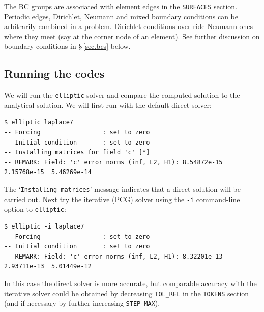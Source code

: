 \documentclass[11pt]{report}
\begin{document}
The BC groups are associated with element edges in the
\texttt{SURFACES} section.  Periodic edges, Dirichlet, Neumann and
mixed boundary conditions can be arbitrarily combined in a problem.
Dirichlet conditions over-ride Neumann ones where they meet (say at
the corner node of an element). See further discussion on boundary
conditions in \S\,\ref{sec.bcs} below.

\subsection{Running the codes}
\label{sec.runell}

We will run the \verb|elliptic| solver and compare the computed
solution to the analytical solution.  We will first run with the
default direct solver: 
%
{\small
\begin{verbatim}
$ elliptic laplace7
-- Forcing                 : set to zero
-- Initial condition       : set to zero
-- Installing matrices for field 'c' [*]
-- REMARK: Field: 'c' error norms (inf, L2, H1): 8.54872e-15  2.15768e-15  5.46269e-14
\end{verbatim}
}

The `\verb|Installing matrices|' message indicates that a direct
solution will be carried out.  Next try the iterative (PCG) solver
using the \verb+-i+ command-line option to \texttt{elliptic}:
%
{\small
\begin{verbatim}
$ elliptic -i laplace7
-- Forcing                 : set to zero
-- Initial condition       : set to zero
-- REMARK: Field: 'c' error norms (inf, L2, H1): 8.32201e-13  2.93711e-13  5.01449e-12
\end{verbatim}
}
\noindent
In this case the direct solver is more accurate, but comparable
accuracy with the iterative solver could be obtained by decreasing
\verb+TOL_REL+ in the \texttt{TOKENS} section (and if necessary by
further increasing \verb+STEP_MAX+).

\end{document}
